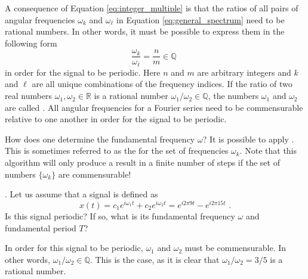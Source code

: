 A consequence of Equation \ref{eq:integer_multiple} is that the ratios
of all pairs of angular frequencies $\omega_k$ and $\omega_{\ell}$ in
Equation \ref{eq:general_spectrum} need to be rational numbers. In
other words, it must be possible to express them in the following form
\begin{equation}
  \frac{\omega_k}{\omega_{\ell}} = \frac{n}{m} \in \mathbb{Q} \,\,
\end{equation}
in order for the signal to be periodic. Here $n$ and $m$ are arbitrary
integers and $k$ and $\ell$ are all unique combinations of the
frequency indices.  If the ratio of two real numbers
$\omega_1,\omega_2\in\mathbb{R}$ is a rational number
$\omega_1/\omega_2 \in \mathbb{Q}$, the numbers $\omega_1$ and
$\omega_2$ are called \emph{.}
All angular frequencies for a Fourier series need to be commensurable
relative to one another in order for the signal to be periodic.

How does one determine the fundamental frequency $\omega$? It is
possible to apply \emph{}. This is sometimes referred to as
the \emph{}
for the set of frequencies $\omega_k$. Note that this algorithm will
only produce a result in a finite number of steps if the set of
numbers $\{\omega_k\}$ are commensurable!

. Let us assume that a signal is defined as
\begin{equation}
  x(t) = c_1 e^{i \omega_1 t} + c_2 e^{i \omega_2 t} = e^{i 2\pi 9t} -
  e^{i 2\pi 15t} \,\,.
\end{equation}
Is this signal periodic? If so, what is its fundamental frequency
$\omega$ and fundamental period $T$?

In order for this signal to be periodic, $\omega_1$ and $\omega_2$ must be commensurable.
In other words, $\omega_1/\omega_2 \in \mathbb{Q}$. This is the case, as it is clear
that $\omega_1/\omega_2 = 3/5$ is a rational number.

